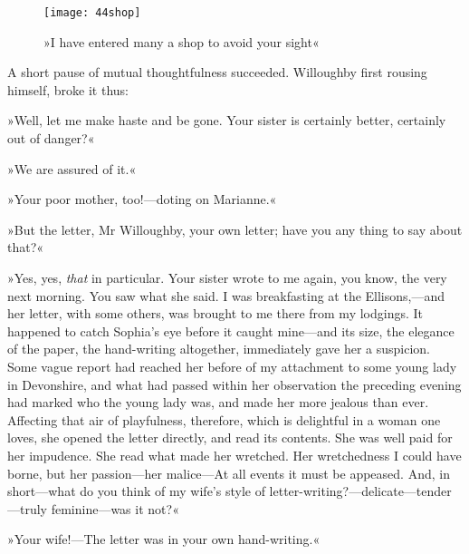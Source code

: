 \begin{letter}
	\begin{figure}[tbph]
		\centering
		\texttt{[image: 44shop]}
		\caption{»I have entered many a shop to avoid your sight«}
	\end{figure}
\end{letter}

A short pause of mutual thoughtfulness succeeded. Willoughby first rousing himself, broke it thus:

»Well, let me make haste and be gone. Your sister is certainly better, certainly out of danger?«

»We are assured of it.«

»Your poor mother, too!—doting on Marianne.«

»But the letter, Mr Willoughby, your own letter; have you any thing to say about that?«

»Yes, yes, \textit{that} in particular. Your sister wrote to me again, you know, the very next morning. You saw what she said. I was breakfasting at the Ellisons,—and her letter, with some others, was brought to me there from my lodgings. It happened to catch Sophia’s eye before it caught mine—and its size, the elegance of the paper, the hand-writing altogether, immediately gave her a suspicion. Some vague report had reached her before of my attachment to some young lady in Devonshire, and what had passed within her observation the preceding evening had marked who the young lady was, and made her more jealous than ever. Affecting that air of playfulness, therefore, which is delightful in a woman one loves, she opened the letter directly, and read its contents. She was well paid for her impudence. She read what made her wretched. Her wretchedness I could have borne, but her passion—her malice—At all events it must be appeased. And, in short—what do you think of my wife’s style of letter-writing?—delicate—tender—truly feminine—was it not?«

»Your wife!—The letter was in your own hand-writing.«

